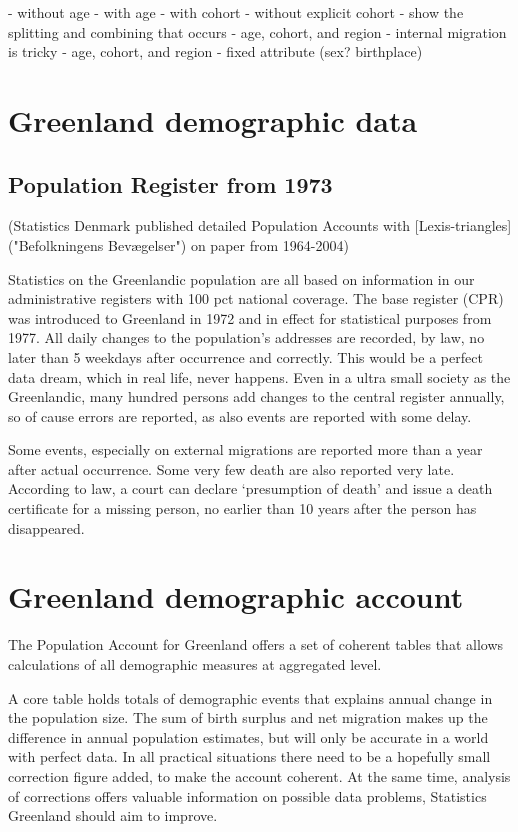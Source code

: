 \documentclass[USenglish]{article}
\begin{document}
- without age
- with age
   - with cohort
   - without explicit cohort
- show the splitting and combining that occurs   
- age, cohort, and region
   - internal migration is tricky
- age, cohort, and region - fixed attribute (sex? birthplace)



\section{Greenland demographic data}

\subsection{Population Register from 1973} 

(Statistics Denmark published detailed Population Accounts with [Lexis-triangles]("Befolkningens Bevægelser") on paper from 1964-2004)

Statistics on the Greenlandic population are all based on information in our administrative registers with 100 pct national coverage. The base register (CPR) was introduced to Greenland in 1972 and in effect for statistical purposes from 1977. All daily changes to the population’s addresses are recorded, by law, no later than 5 weekdays after occurrence and correctly. This would be a perfect data dream, which in real life, never happens. Even in a ultra small society as the Greenlandic, many hundred persons add changes to the central register annually, so of cause errors are reported, as also events are reported with some delay.

Some events, especially on external migrations are reported more than a year after actual occurrence. Some very few death are also reported very late. According to law, a court can declare ‘presumption of death’ and issue a death certificate for a missing person, no earlier than 10 years after the person has disappeared.



\section{Greenland demographic account}

The Population Account for Greenland offers a set of coherent tables that allows calculations of all demographic measures at aggregated level.

A core table holds totals of demographic events that  explains annual change in the population size. The sum of birth surplus and net migration makes up the difference in annual population estimates, but will only be accurate in a world with perfect data. In all practical situations there need to be a hopefully small correction figure added, to make the account coherent. At the same time, analysis of corrections offers valuable information on possible data problems, Statistics Greenland should aim to improve.
\end{document}
